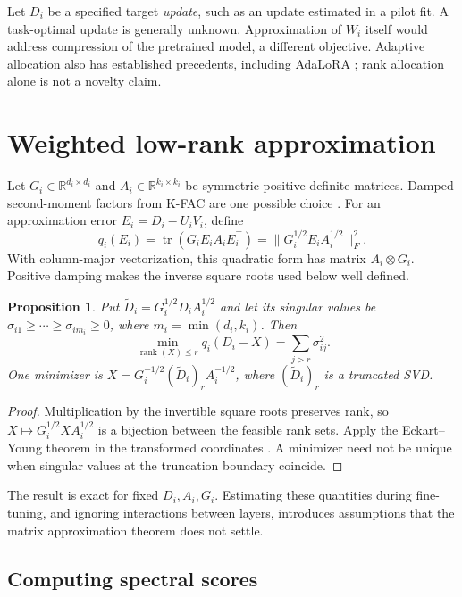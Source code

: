 \documentclass[11pt]{article}
\newtheorem{proposition}{Proposition}
\newcommand{\tr}{\operatorname{tr}}
\newcommand{\rank}{\operatorname{rank}}
\begin{document}
Let $D_i$ be a specified target \emph{update}, such as an update estimated in a
pilot fit. A task-optimal update is generally unknown. Approximation of $W_i$
itself would address compression of the pretrained model, a different objective.
Adaptive allocation also has established precedents, including AdaLoRA
\cite{zhang2023adalora}; rank allocation alone is not a novelty claim.

\section{Weighted low-rank approximation}

Let $G_i\in\mathbb{R}^{d_i\times d_i}$ and
$A_i\in\mathbb{R}^{k_i\times k_i}$ be symmetric positive-definite matrices.
Damped second-moment factors from K-FAC are one possible choice
\cite{martens2015kfac}. For an approximation error $E_i=D_i-U_iV_i$, define
\[
 q_i(E_i)=\tr(G_iE_iA_iE_i^\top)
          =\|G_i^{1/2}E_iA_i^{1/2}\|_F^2.
\]
With column-major vectorization, this quadratic form has matrix
$A_i\otimes G_i$. Positive damping makes the inverse square roots used below
well defined.

\begin{proposition}
Put $\widetilde D_i=G_i^{1/2}D_iA_i^{1/2}$ and let its singular values be
$\sigma_{i1}\geq\cdots\geq\sigma_{im_i}\geq0$, where
$m_i=\min(d_i,k_i)$. Then
\[
 \min_{\rank(X)\leq r} q_i(D_i-X)=\sum_{j>r}\sigma_{ij}^2.
\]
One minimizer is
$X=G_i^{-1/2}(\widetilde D_i)_r A_i^{-1/2}$, where
$(\widetilde D_i)_r$ is a truncated SVD.
\end{proposition}

\begin{proof}
Multiplication by the invertible square roots preserves rank, so
$X\mapsto G_i^{1/2}XA_i^{1/2}$ is a bijection between the feasible rank sets.
Apply the Eckart--Young theorem in the transformed coordinates
\cite{eckart1936approximation}. A minimizer need not be unique when singular
values at the truncation boundary coincide.
\end{proof}

The result is exact for fixed $D_i,A_i,G_i$. Estimating these quantities during
fine-tuning, and ignoring interactions between layers, introduces assumptions
that the matrix approximation theorem does not settle.

\subsection{Computing spectral scores}
\end{document}
